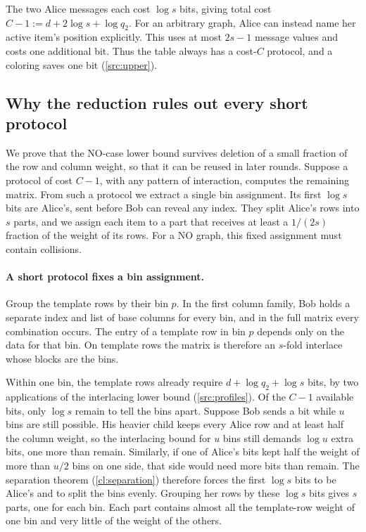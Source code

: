 \documentclass[11pt,letterpaper]{article} \usepackage[utf8]{inputenc}
\theoremstyle{plain} \newtheorem{theorem}{Theorem}[section]
\theoremstyle{definition} \newaliascnt{definition}{theorem}
\begin{document}
The two Alice messages each cost $\log s$ bits, giving total cost
$C-1:=d+2\log s+\log q_2$. For an arbitrary graph, Alice can instead name
her active item's position explicitly. This uses at most $2s-1$ message
values and costs one additional bit. Thus the table always has a
cost-$C$ protocol, and a coloring saves one bit
(\cref{src:upper}).

\subsection{Why the reduction rules out every short protocol}

We prove that the NO-case lower bound survives deletion of a small fraction
of the row and column weight, so that it can be reused in later rounds.
Suppose a protocol of cost $C-1$, with any pattern of interaction, computes
the remaining matrix. From such a protocol we
extract a single bin assignment. Its first $\log s$ bits are Alice's,
sent before Bob can reveal any index. They split Alice's rows into $s$
parts, and we assign each item to a part that receives at least a
$1/(2s)$ fraction of the weight of its rows. For a NO graph, this fixed assignment must contain
collisions.

\paragraph{A short protocol fixes a bin assignment.}
Group the template rows by their bin $p$. In the first column family,
Bob holds a separate index and list of base columns for every bin,
and in the full matrix every combination occurs. The entry of a template row in bin $p$ depends only
on the data for that bin. On template rows the matrix is therefore an
$s$-fold interlace whose blocks are the bins.

Within one bin, the template rows already require
$d+\log q_2+\log s$ bits, by two applications of the interlacing lower
bound (\cref{src:profiles}). Of the $C-1$ available bits, only $\log s$
remain to tell the bins apart.
Suppose Bob sends a bit while $u$ bins are still possible. His heavier
child keeps every Alice row and at least half the column weight, so the interlacing
bound for $u$ bins still demands $\log u$ extra bits,
one more than remain. Similarly, if one of Alice's bits kept half the
weight of more than $u/2$ bins on one side, that side would need more bits
than remain. The
separation theorem (\cref{cl:separation}) therefore forces the first
$\log s$ bits to be Alice's and to split the bins evenly. Grouping her rows
by these $\log s$ bits gives $s$ parts, one for each bin. Each part contains almost all the template-row weight of one bin
and very little of the weight of the others.
\end{document}
